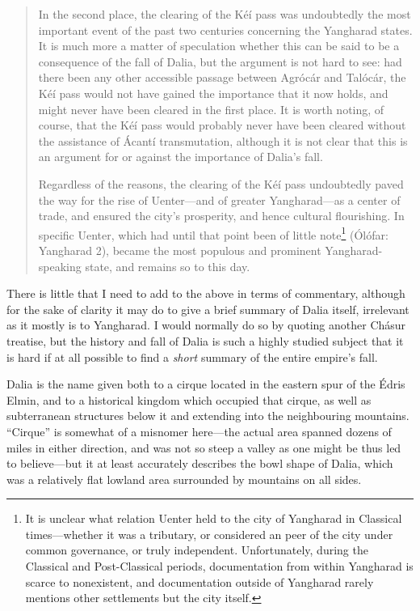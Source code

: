 \documentclass{article}
\begin{document}
\begin{quotation}
In the second place, the clearing of the Kéí pass was undoubtedly the most important event of the past two centuries concerning the Yangharad states. It is much more a matter of speculation whether this can be said to be a consequence of the fall of Dalia, but the argument is not hard to see: had there been any other accessible passage between Agrócár and Talócár, the Kéí pass would not have gained the importance that it now holds, and might never have been cleared in the first place. It is worth noting, of course, that the Kéí pass would probably never have been cleared without the assistance of Ácantí transmutation, although it is not clear that this is an argument for or against the importance of Dalia's fall.

Regardless of the reasons, the clearing of the Kéí pass undoubtedly paved the way for the rise of Uenter—and of greater Yangharad—as a center of trade, and ensured the city's prosperity, and hence cultural flourishing. In specific Uenter, which had until that point been of little note\footnote{It is unclear what relation Uenter held to the city of Yangharad in Classical times—whether it was a tributary, or considered an peer of the city under common governance, or truly independent. Unfortunately, during the Classical and Post-Classical periods, documentation from within Yangharad is scarce to nonexistent, and documentation outside of Yangharad rarely mentions other settlements but the city itself.} (Ólófar: Yangharad 2), became the most populous and prominent Yangharad-speaking state, and remains so to this day.

\end{quotation}

\color{DarkGreen}

There is little that I need to add to the above in terms of commentary, although for the sake of clarity it may do to give a brief summary of Dalia itself, irrelevant as it mostly is to Yangharad. I would normally do so by quoting another Chásur treatise, but the history and fall of Dalia is such a highly studied subject that it is hard if at all possible to find a \emph{short} summary of the entire empire's fall.

Dalia is the name given both to a cirque located in the eastern spur of the Édris Elmin, and to a historical kingdom which occupied that cirque, as well as subterranean structures below it and extending into the neighbouring mountains. ``Cirque'' is somewhat of a misnomer here—the actual area spanned dozens of miles in either direction, and was not so steep a valley as one might be thus led to believe—but it at least accurately describes the bowl shape of Dalia, which was a relatively flat lowland area surrounded by mountains on all sides.
\end{document}
